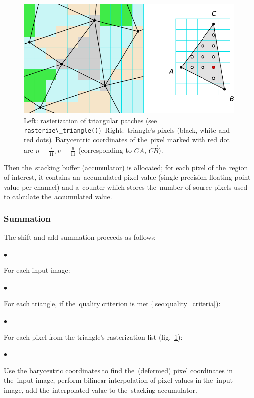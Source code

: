 \documentclass[12pt]{article}
\newcommand{\nbd}{\nobreakdash}
\begin{document}
\begin{figure}
\centering
\includegraphics{rasterization.pdf}
\caption{Left: rasterization of triangular patches (see \lstinline$rasterize\_triangle()$). Right:~triangle's pixels
(black, white and red dots). Barycentric coordinates of the~pixel marked with red dot are $u=\frac{2}{11},
v=\frac{6}{11}$ (corresponding to $\vec{CA}$, $\vec{CB}$).}
\label{fig:rasterization}
\end{figure}

Then the~stacking buffer (accumulator) is allocated; for each pixel of the~region of interest, it contains
an~accumulated pixel value (single\nobreakdash-precision floating\nobreakdash-point value per channel) and a~counter
which stores the~number of source pixels used to calculate the~accumulated value.

\subsubsection{Summation}

The shift\nbd-and\nbd-add summation proceeds as follows:

\begin{list}{$\bullet$}{}
    \item For each input image:
    \begin{list}{$\bullet$}{}
        \item For each triangle, if the~quality criterion is met (\ref{sec:quality_criteria}):
        \begin{list}{$\bullet$}{}
            \item For each pixel from the triangle's rasterization list (fig.~\ref{fig:rasterization}):
            \begin{list}{$\bullet$}{}
                \item Use the barycentric coordinates to find the~(deformed) pixel coordinates in the~input image,
                      perform bilinear interpolation of pixel values in the~input image, add the~interpolated value to
                      the~stacking accumulator.
            \end{list}
        \end{list}
    \end{list}
\end{list}
\end{document}
